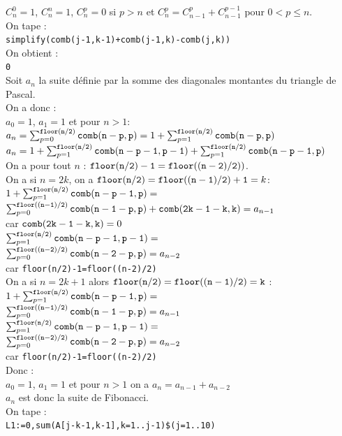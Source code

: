 \documentclass[a4paper,11pt]{book}
\begin{document}
$C_n^0=1$, $C_n^n=1$, $C_n^p=0$ si $p>n$ et  $C_n^p=C_{n-1}^p+C_{n-1}^{p-1}$ pour
 $0<p\leq n$.\\
On tape :\\
{\tt simplify(comb(j-1,k-1)+comb(j-1,k)-comb(j,k))}\\
On obtient :\\
{\tt 0}\\
Soit $a_n$ la suite d\'efinie par la somme des diagonales montantes du 
triangle de Pascal.\\
On a donc :\\
$a_0=1$, $a_1=1$ et pour $n>1$:\\
$a_n=\sum_{p=0}^{{\tt floor(n/2)}}{\tt comb(n-p,p)}=1+\sum_{p=1}^{{\tt floor(n/2)}}{\tt comb(n-p,p)}$\\ 
$a_n=1+\sum_{p=1}^{{\tt floor(n/2)}}{\tt comb(n-p-1,p-1)}+\sum_{p=1}^{{\tt floor(n/2)}}{\tt comb(n-p-1,p)}$\\
On a pour tout $n$ : ${\tt floor(n/2)-1=floor((n-2)/2))}$.\\
On a si  $n=2k$, on a ${\tt floor(n/2)=floor((n-1)/2)+1}=k$:\\
$1+\sum_{p=1}^{{\tt floor(n/2)}}{\tt comb(n-p-1,p)}=$\\
$\sum_{p=0}^{{\tt floor((n-1)/2)}}{\tt comb(n-1-p,p)}+{\tt comb(2k-1-k,k)}=a_{n-1}$\\ 
car ${\tt comb(2k-1-k,k)}=0$\\
$\sum_{p=1}^{{\tt floor(n/2)}}{\tt comb(n-p-1,p-1)}=$\\
$\sum_{p=0}^{{\tt floor((n-2)/2)}}{\tt comb(n-2-p,p)}=a_{n-2}$\\ 
car {\tt floor(n/2)-1=floor((n-2)/2)}\\
On a si  $n=2k+1$ alors ${\tt floor(n/2)=floor((n-1)/2)=k}$ :\\
$1+\sum_{p=1}^{{\tt floor(n/2)}}{\tt comb(n-p-1,p)}=$\\
$\sum_{p=0}^{{\tt floor((n-1)/2)}}{\tt comb(n-1-p,p)}=a_{n-1}$\\
$\sum_{p=1}^{{\tt floor(n/2)}}{\tt comb(n-p-1,p-1)}=$\\
$\sum_{p=0}^{{\tt floor((n-2)/2)}}{\tt comb(n-2-p,p)}=a_{n-2}$ \\
car {\tt floor(n/2)-1=floor((n-2)/2)}\\
Donc :\\
$a_0=1$, $a_1=1$ et pour $n>1$ on a
$a_n=a_{n-1}+a_{n-2}$\\
$a_n$ est donc la suite de Fibonacci.\\
On tape :\\
{\tt L1:=0,sum(A[j-k-1,k-1],k=1..j-1)\$(j=1..10)}\\
\end{document}
